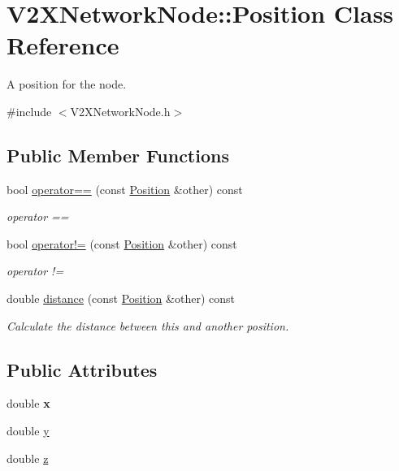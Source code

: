 \hypertarget{classV2XNetworkNode_1_1Position}{}\section{V2\+X\+Network\+Node\+:\+:Position Class Reference}
\label{classV2XNetworkNode_1_1Position}


A position for the node.  




{\ttfamily \#include $<$V2\+X\+Network\+Node.\+h$>$}

\subsection*{Public Member Functions}
\begin{DoxyCompactItemize}
\item 
bool \hyperlink{classV2XNetworkNode_1_1Position_a766bb75d24d9e692aa07f2d1a7c971f2}{operator==} (const \hyperlink{classV2XNetworkNode_1_1Position}{Position} \&other) const 
\begin{DoxyCompactList}\small\item\em operator == \end{DoxyCompactList}\item 
bool \hyperlink{classV2XNetworkNode_1_1Position_a897c79c59c60ebb5ce43878605b0db2f}{operator!=} (const \hyperlink{classV2XNetworkNode_1_1Position}{Position} \&other) const 
\begin{DoxyCompactList}\small\item\em operator != \end{DoxyCompactList}\item 
double \hyperlink{classV2XNetworkNode_1_1Position_acf9f224fe0a687529dfcd707d189028b}{distance} (const \hyperlink{classV2XNetworkNode_1_1Position}{Position} \&other) const 
\begin{DoxyCompactList}\small\item\em Calculate the distance between this and another position. \end{DoxyCompactList}\end{DoxyCompactItemize}
\subsection*{Public Attributes}
\begin{DoxyCompactItemize}
\item 
double {\bfseries x}\hypertarget{classV2XNetworkNode_1_1Position_a49b66d898791f81b609d5fb3cb45fa50}{}\label{classV2XNetworkNode_1_1Position_a49b66d898791f81b609d5fb3cb45fa50}

\item 
double \hyperlink{classV2XNetworkNode_1_1Position_a6bcf9361cdd45657683e88c63667b8e6}{y}
\item 
double \hyperlink{classV2XNetworkNode_1_1Position_a62ad74894b82d59081584aab1b5598a2}{z}
\end{DoxyCompactItemize}


